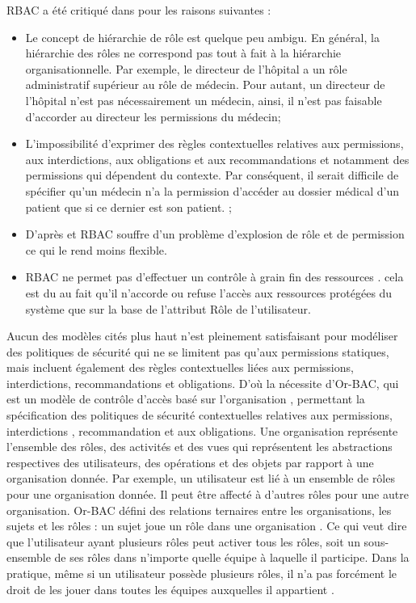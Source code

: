 RBAC a été critiqué dans \cite{abou03} pour les raisons suivantes :
\begin{itemize}
\item Le concept de hiérarchie de rôle est quelque peu ambigu. En général, la hiérarchie des rôles ne correspond pas tout à fait à la hiérarchie organisationnelle. Par exemple, le directeur de l'hôpital a un rôle administratif supérieur au rôle de médecin. Pour autant, un directeur de l'hôpital n'est pas nécessairement un médecin, ainsi, il n'est pas faisable d'accorder au directeur les permissions du médecin;
\item L'impossibilité d'exprimer des règles contextuelles relatives aux permissions, aux interdictions, aux obligations et aux recommandations et notamment des permissions qui dépendent du contexte. Par conséquent, il serait difficile de spécifier qu'un médecin n'a la permission d'accéder au dossier médical d'un patient que si ce dernier est son patient.
;
\item D'après \cite{singh19} et \cite{rajpoot15} RBAC souffre d'un problème d'explosion de rôle et de permission ce qui le rend moins flexible.
\item RBAC ne permet pas d'effectuer un contrôle à grain fin des ressources . cela est du au fait qu'il n'accorde ou refuse l'accès aux ressources protégées du système que sur la base de l'attribut Rôle de l'utilisateur.
\end{itemize}

\label{sectionORBAC}

Aucun des modèles cités plus haut n'est pleinement satisfaisant pour modéliser des politiques de sécurité qui ne se limitent pas qu'aux permissions statiques, mais incluent également des règles contextuelles liées aux permissions, interdictions, recommandations et obligations. D'où la nécessite d'Or-BAC, qui est un modèle de contrôle d'accès basé sur l'organisation \cite{kalam03}, permettant la spécification des politiques de sécurité contextuelles relatives aux permissions, interdictions , recommandation et aux obligations. Une organisation représente l'ensemble des rôles, des activités et des vues qui représentent les abstractions respectives des utilisateurs, des opérations et des objets par rapport à une organisation donnée. Par exemple, un utilisateur est lié à un ensemble de rôles pour une organisation donnée. Il peut être affecté à d'autres rôles pour une autre organisation. Or-BAC défini des relations ternaires entre les organisations, les sujets et les rôles : un sujet joue un rôle dans une organisation  \cite{lindqvist06}. Ce qui veut dire que l'utilisateur ayant plusieurs rôles peut activer tous les rôles, soit un sous-ensemble de ses rôles dans n'importe quelle équipe à laquelle il participe. Dans la pratique, même si un utilisateur possède plusieurs rôles, il n'a pas forcément le droit de les jouer dans toutes les équipes auxquelles il appartient \cite{kalam03}.



